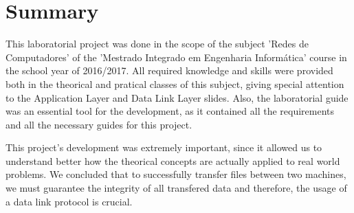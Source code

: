 \documentclass[a4paper]{article}
\begin{document}

\newpage

%
%
%
%
%
%
%



\section{Summary}

This laboratorial project was done in the scope of the subject 'Redes de Computadores' of the 'Mestrado Integrado em Engenharia Informática' course in the school year of 2016/2017. All required knowledge and skills were provided both in the theorical and pratical classes of this subject, giving special attention to the Application Layer and Data Link Layer slides. Also, the laboratorial guide was an essential tool for the development, as it contained all the requirements and all the necessary guides for this project.

This project's development was extremely important, since it allowed us to understand better how the theorical concepts are actually applied to real world problems. We concluded that to successfully transfer files between two machines, we must guarantee the integrity of all transfered data and therefore, the usage of a data link protocol is crucial.
\end{document}
